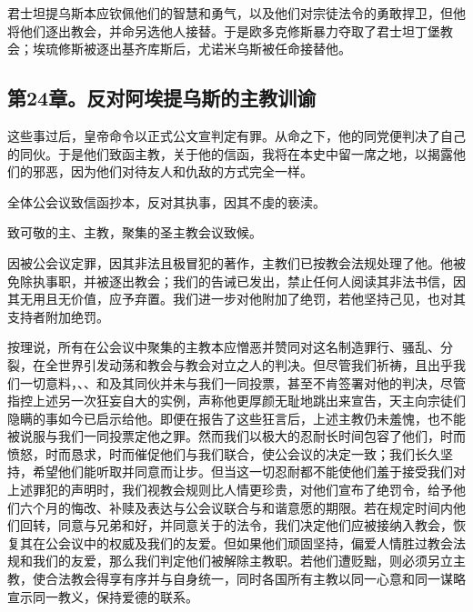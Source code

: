 君士坦提乌斯本应钦佩他们的智慧和勇气，以及他们对宗徒法令的勇敢捍卫，但他将他们逐出教会，并命另选他人接替。于是欧多克修斯暴力夺取了君士坦丁堡教会；埃琉修斯被逐出基齐库斯后，尤诺米乌斯被任命接替他。\par


\subsection{第24章。反对阿埃提乌斯的主教训谕}

这些事过后，皇帝命令以正式公文宣判定有罪。从命之下，他的同党便判决了自己的同伙。于是他们致函主教，关于他的信函，我将在本史中留一席之地，以揭露他们的邪恶，因为他们对待友人和仇敌的方式完全一样。\par

全体公会议致信函抄本，反对其执事，因其不虔的亵渎。\par

致可敬的主、主教，聚集的圣主教会议致候。\par

因被公会议定罪，因其非法且极冒犯的著作，主教们已按教会法规处理了他。他被免除执事职，并被逐出教会；我们的告诫已发出，禁止任何人阅读其非法书信，因其无用且无价值，应予弃置。我们进一步对他附加了绝罚，若他坚持己见，也对其支持者附加绝罚。\par

按理说，所有在公会议中聚集的主教本应憎恶并赞同对这名制造罪行、骚乱、分裂，在全世界引发动荡和教会与教会对立之人的判决。但尽管我们祈祷，且出乎我们一切意料，、、和及其同伙并未与我们一同投票，甚至不肯签署对他的判决，尽管指控上述另一次狂妄自大的实例，声称他更厚颜无耻地跳出来宣告，天主向宗徒们隐瞒的事如今已启示给他。即便在报告了这些狂言后，上述主教仍未羞愧，也不能被说服与我们一同投票定他之罪。然而我们以极大的忍耐长时间包容了他们，时而愤怒，时而恳求，时而催促他们与我们联合，使公会议的决定一致；我们长久坚持，希望他们能听取并同意而让步。但当这一切忍耐都不能使他们羞于接受我们对上述罪犯的声明时，我们视教会规则比人情更珍贵，对他们宣布了绝罚令，给予他们六个月的悔改、补赎及表达与公会议联合与和谐意愿的期限。若在规定时间内他们回转，同意与兄弟和好，并同意关于的法令，我们决定他们应被接纳入教会，恢复其在公会议中的权威及我们的友爱。但如果他们顽固坚持，偏爱人情胜过教会法规和我们的友爱，那么我们判定他们被解除主教职。若他们遭贬黜，则必须另立主教，使合法教会得享有序并与自身统一，同时各国所有主教以同一心意和同一谋略宣示同一教义，保持爱德的联系。\par

